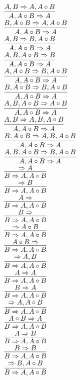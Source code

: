 \documentclass[11pt]{article}
\begin{document}
\begin{center}
\bigskip
\\$\infer{A, A\circ B\Rightarrow A}{A, B\Rightarrow A, A\circ B}$
\bigskip
\\$\infer{A, A\circ B\Rightarrow A}{B, A\circ B\Rightarrow A, A\circ B}$
\bigskip
\\$\infer{A, A\circ B\Rightarrow A}{A, B\Rightarrow B, A\circ B}$
\bigskip
\\$\infer{A, A\circ B\Rightarrow A}{A, B, A\circ B\Rightarrow B}$
\bigskip
\\$\infer{A, A\circ B\Rightarrow A}{A, A\circ B\Rightarrow B, A\circ B}$
\bigskip
\\$\infer{A, A\circ B\Rightarrow A}{B, A\circ B\Rightarrow B, A\circ B}$
\bigskip
\\$\infer{A, A\circ B\Rightarrow A}{A, B, A\circ B\Rightarrow A\circ B}$
\bigskip
\\$\infer{A, A\circ B\Rightarrow A}{A, B\Rightarrow A, B, A\circ B}$
\bigskip
\\$\infer{A, A\circ B\Rightarrow A}{B, A\circ B\Rightarrow A, B, A\circ B}$
\bigskip
\\$\infer{A, A\circ B\Rightarrow A}{A, B, A\circ B\Rightarrow B, A\circ B}$
\bigskip
\\$\infer{B\Rightarrow A, A\circ B}{\Rightarrow A}$
\bigskip
\\$\infer{B\Rightarrow A, A\circ B}{\Rightarrow B}$
\bigskip
\\$\infer{B\Rightarrow A, A\circ B}{A\Rightarrow }$
\bigskip
\\$\infer{B\Rightarrow A, A\circ B}{B\Rightarrow }$
\bigskip
\\$\infer{B\Rightarrow A, A\circ B}{\Rightarrow A\circ B}$
\bigskip
\\$\infer{B\Rightarrow A, A\circ B}{A\circ B\Rightarrow }$
\bigskip
\\$\infer{B\Rightarrow A, A\circ B}{\Rightarrow A, B}$
\bigskip
\\$\infer{B\Rightarrow A, A\circ B}{A\Rightarrow A}$
\bigskip
\\$\infer{B\Rightarrow A, A\circ B}{B\Rightarrow A}$
\bigskip
\\$\infer{B\Rightarrow A, A\circ B}{\Rightarrow A, A\circ B}$
\bigskip
\\$\infer{B\Rightarrow A, A\circ B}{A\circ B\Rightarrow A}$
\bigskip
\\$\infer{B\Rightarrow A, A\circ B}{A\Rightarrow B}$
\bigskip
\\$\infer{B\Rightarrow A, A\circ B}{B\Rightarrow B}$
\bigskip
\\$\infer{B\Rightarrow A, A\circ B}{\Rightarrow B, A\circ B}$

\end{center}
\end{document}
